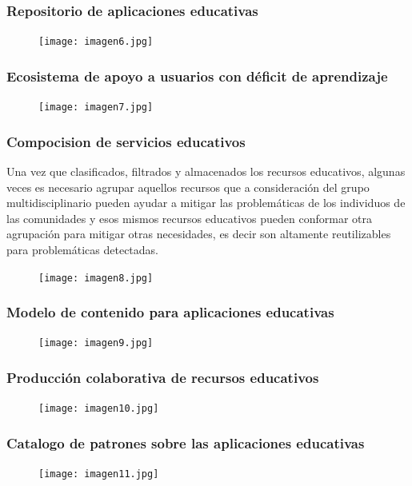\documentclass[11pt]{beamer}
\begin{document}
\begin{frame}
\frametitle{Repositorio de aplicaciones educativas}
    \begin{figure}
    \centering
     \texttt{[image: imagen6.jpg]}
    \end{figure}
\end{frame}

\begin{frame}
\frametitle{Ecosistema de apoyo a usuarios con déficit de aprendizaje}
    \begin{figure}
    \centering
     \texttt{[image: imagen7.jpg]}
    \end{figure}
\end{frame}

\begin{frame}
\frametitle{Compocision de servicios educativos}
    \justify
    Una vez que clasificados, filtrados y almacenados los recursos educativos, algunas veces es necesario agrupar aquellos recursos que a consideración del grupo multidisciplinario pueden ayudar a mitigar las problemáticas de los individuos de las comunidades y esos mismos recursos educativos pueden conformar otra agrupación para mitigar otras necesidades, es decir son altamente reutilizables para problemáticas detectadas.
    \par
    \begin{figure}
    \centering
     \texttt{[image: imagen8.jpg]}
    \end{figure}
\end{frame}

\begin{frame}
\frametitle{Modelo de contenido para aplicaciones educativas}
    \begin{figure}
    \centering
     \texttt{[image: imagen9.jpg]}
    \end{figure}
\end{frame}

\begin{frame}
\frametitle{Producción colaborativa de recursos educativos}
    \begin{figure}
    \centering
     \texttt{[image: imagen10.jpg]}
    \end{figure}
\end{frame}

\begin{frame}
\frametitle{Catalogo de patrones sobre las aplicaciones educativas}
    \begin{figure}
    \centering
     \texttt{[image: imagen11.jpg]}
    \end{figure}
\end{frame}
\end{document}
